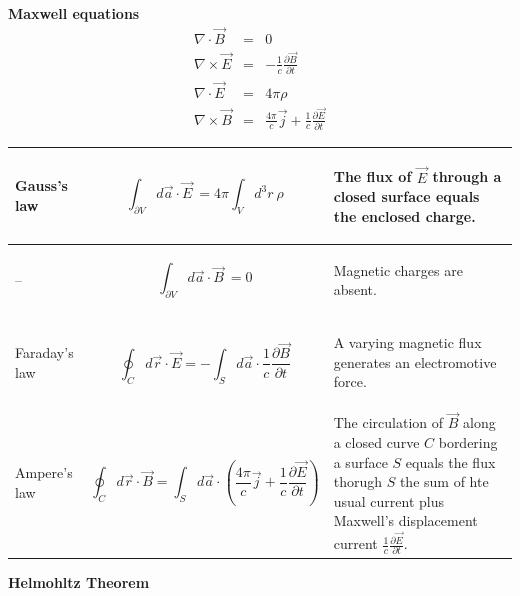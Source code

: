 \documentclass[12pt,a4paper]{article}
\newcommand{\pd}[2]{\frac{\partial #1}{\partial #2}} %
\newcommand{\integral}[3]{\int_{#1}^{#2} d #3 \ } %
\begin{document}
\textbf{Maxwell equations}
\begin{eqnarray}
	\nabla \cdot \vec{B} & = & 0 \\
	\nabla \times \vec{E} & = & -\frac{1}{c}\frac{\partial \vec{B}}{\partial t} \\ 
	\nabla \cdot \vec{E} & = & 4 \pi \rho \\
	\nabla \times \vec{B} & = &\frac{4\pi}{c}\vec{j} +\frac{1}{c}\frac{\partial \vec{E}}{\partial t}
\end{eqnarray}
\begin{center}
\begin{tabular}{ | p{} | p{}| p{} | }
\hline
Gauss's law & \begin{equation}
\integral{\partial V}{}{\vec{a}\cdot \vec{E}} = 4\pi\integral{V}{}{^3r} \rho
\end{equation} &  \begin{center}
The flux of $\vec{E}$ through a closed surface equals the enclosed charge.
\end{center} \\
\hline
-- & \begin{equation}
\integral{\partial V}{}{\vec{a}\cdot \vec{B}} = 0
\end{equation} & \begin{center}
	Magnetic charges are absent.
\end{center}  \\
\hline
Faraday's law & \begin{equation}
\oint_C d\vec{r} \cdot \vec{E} = -\int_S d\vec{a} \cdot \frac{1}{c}\pd{\vec{B}}{t}
\end{equation} & \begin{center}
A varying magnetic flux generates an electromotive force.
\end{center} \\
\hline
Ampere's law & \begin{equation}
\oint_C d\vec{r} \cdot \vec{B} = \int_S d\vec{a}\cdot\left( \frac{4\pi}{c}\vec{j}+\frac{1}{c}\pd{\vec{E}}{t} \right)
\end{equation}  & The circulation of $\vec{B}$
 along a closed curve $C$ bordering a surface $S$ equals the flux thorugh $S$ the sum of hte usual current plus Maxwell's displacement current $\frac{1}{c}\pd{\vec{E}}{t} $. \\
\hline
\end{tabular}

\end{center}
\textbf{Helmohltz Theorem}
\end{document}
